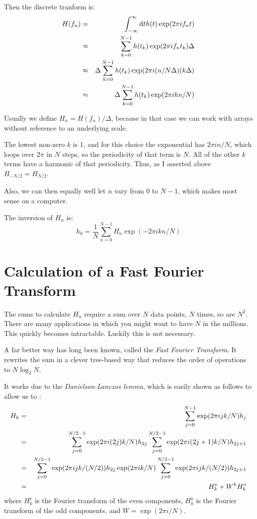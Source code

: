 Then the discrete tranform is:
\begin{eqnarray}
H(f_n) &=& \int_{-\infty}^{\infty} {\rm d}t h(t) \exp(2\pi i f_n t) \cr
&\approx& \sum_{k=0}^{N-1} h(t_k) \exp(2\pi i f_n t_k) \Delta \cr
&\approx& \Delta \sum_{k=0}^{N-1} h(t_k) \exp(2\pi i (n / N\Delta)
(k\Delta) \cr
&\approx& \Delta \sum_{k=0}^{N-1} h(t_k) \exp(2\pi i k n / N)
\end{eqnarray}

Usually we define $H_n = H(f_n) / \Delta$, because in that case we can
work with arrays without reference to an underlying scale.


\begin{answer}
The lowest non-zero $k$ is 1, and for this choice the exponential has
$2\pi i n/N$, which loops over $2\pi$ in $N$ steps, so the periodicity
of that term is $N$. All of the other $k$ terms have a harmonic of
that periodicity. Thus, as I asserted above $H_{-N/2} = H_{N/2}$.

Also, we can then equally well let $n$ vary from $0$ to $N-1$, which
makes most sense on a computer.
\end{answer}

The inversion of $H_n$ is:
\begin{equation}
h_k = \frac{1}{N} \sum_{n=0}^{N-1} H_n \exp(-2\pi i k n/N)
\end{equation}

\section{Calculation of a Fast Fourier Transform}


\begin{answer}
The sums to calculate $H_n$ require a sum over $N$ data points, $N$
times, so are $N^2$. There are many applications in which you might
want to have $N$ in the millions. This quickly becomes
intractable. Luckily this is not necessary.
\end{answer}

A far better way has long been known, called the {\it Fast Fourier
  Transform}. It rewrites the sum in a clever tree-based way that
reduces the order of operations to $N\log_2 N$.

It works due to the {\it Danielson-Lanczos lemma}, which is easily
shown as follows to allow us to :
\begin{eqnarray}
H_k &=& \sum_{j=0}^{N-1} \exp(2\pi i jk /N) h_j \cr
&=& \sum_{j=0}^{N/2-1} \exp(2\pi i (2j) k /N) h_{2j} 
\sum_{j=0}^{N/2-1} \exp(2\pi i (2j + 1) k /N) h_{2j+1} \cr
&=& \sum_{j=0}^{N/2-1} \exp(2\pi i j k / (N/2)) h_{2j} 
\exp(2\pi i k /N) \sum_{j=0}^{N/2-1} \exp(2\pi i j k / (N/2)) h_{2j+1} \cr
&=& H_k^e + W^k H_k^o
\end{eqnarray}
where $H_k^e$ is the Fourier transform of the even components, $H_k^o$
is the Fourier transform of the odd components, and $W=\exp(2\pi i
/N)$. 

